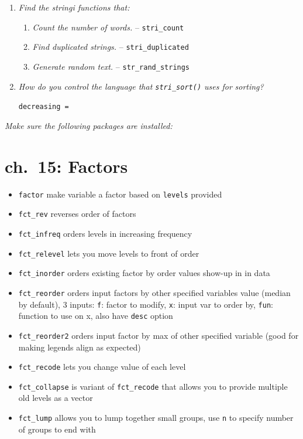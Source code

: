 \documentclass[]{book}
\providecommand{\tightlist}{%
  \setlength{\itemsep}{0pt}\setlength{\parskip}{0pt}}
\theoremstyle{definition}
\theoremstyle{definition}
\theoremstyle{definition}
\theoremstyle{remark}
\begin{document}
\begin{enumerate}
\def\labelenumi{\arabic{enumi}.}
\item
  \emph{Find the stringi functions that:}

  \begin{enumerate}
  \def\labelenumii{\arabic{enumii}.}
  \tightlist
  \item
    \emph{Count the number of words.} -- \texttt{stri\_count}
  \item
    \emph{Find duplicated strings.} -- \texttt{stri\_duplicated}
  \item
    \emph{Generate random text.} -- \texttt{str\_rand\_strings}
  \end{enumerate}
\item
  \emph{How do you control the language that \texttt{stri\_sort()} uses
  for } \emph{sorting?}

  \texttt{decreasing\ =}
\end{enumerate}

\emph{Make sure the following packages are installed:}

\hypertarget{ch.-15-factors}{%
\chapter{ch.~15: Factors}\label{ch.-15-factors}}

\begin{itemize}
\tightlist
\item
  \texttt{factor} make variable a factor based on \texttt{levels}
  provided
\item
  \texttt{fct\_rev} reverses order of factors
\item
  \texttt{fct\_infreq} orders levels in increasing frequency
\item
  \texttt{fct\_relevel} lets you move levels to front of order
\item
  \texttt{fct\_inorder} orders existing factor by order values show-up
  in in data
\item
  \texttt{fct\_reorder} orders input factors by other specified
  variables value (median by default), 3 inputs: \texttt{f}: factor to
  modify, \texttt{x}: input var to order by, \texttt{fun}: function to
  use on x, also have \texttt{desc} option
\item
  \texttt{fct\_reorder2} orders input factor by max of other specified
  variable (good for making legends align as expected)
\item
  \texttt{fct\_recode} lets you change value of each level
\item
  \texttt{fct\_collapse} is variant of \texttt{fct\_recode} that allows
  you to provide multiple old levels as a vector
\item
  \texttt{fct\_lump} allows you to lump together small groups, use
  \texttt{n} to specify number of groups to end with
\end{itemize}
\end{document}
